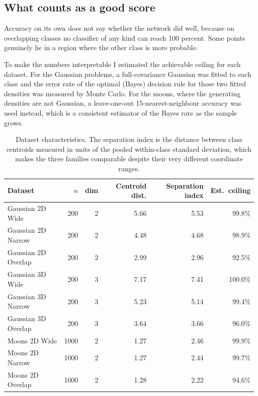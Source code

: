\documentclass[11pt]{article}
\begin{document}
\subsection{What counts as a good score}

Accuracy on its own does not say whether the network did well, because on
overlapping classes no classifier of any kind can reach 100 percent. Some points
genuinely lie in a region where the other class is more probable.

To make the numbers interpretable I estimated the achievable ceiling for each
dataset. For the Gaussian problems, a full-covariance Gaussian was fitted to
each class and the error rate of the optimal (Bayes) decision rule for those two
fitted densities was measured by Monte Carlo. For the moons, where the
generating densities are not Gaussian, a leave-one-out 15-nearest-neighbour
accuracy was used instead, which is a consistent estimator of the Bayes rate as
the sample grows.

\begin{table}[H]
\centering
\small
\begin{tabular}{lrrrrr}
\toprule
Dataset & $n$ & dim & Centroid dist. & Separation index & Est.\ ceiling \\
\midrule
Gaussian 2D Wide     &  200 & 2 & 5.66 & 5.53 & 99.8\% \\
Gaussian 2D Narrow   &  200 & 2 & 4.48 & 4.68 & 98.9\% \\
Gaussian 2D Overlap  &  200 & 2 & 2.99 & 2.96 & 92.5\% \\
Gaussian 3D Wide     &  200 & 3 & 7.17 & 7.41 & 100.0\% \\
Gaussian 3D Narrow   &  200 & 3 & 5.23 & 5.14 & 99.4\% \\
Gaussian 3D Overlap  &  200 & 3 & 3.64 & 3.66 & 96.0\% \\
Moons 2D Wide        & 1000 & 2 & 1.27 & 2.46 & 99.9\% \\
Moons 2D Narrow      & 1000 & 2 & 1.27 & 2.44 & 99.7\% \\
Moons 2D Overlap     & 1000 & 2 & 1.28 & 2.22 & 94.6\% \\
\bottomrule
\end{tabular}
\caption{Dataset characteristics. The separation index is the distance between
class centroids measured in units of the pooled within-class standard
deviation, which makes the three families comparable despite their very
different coordinate ranges.}
\label{tab:chars}
\end{table}
\end{document}

